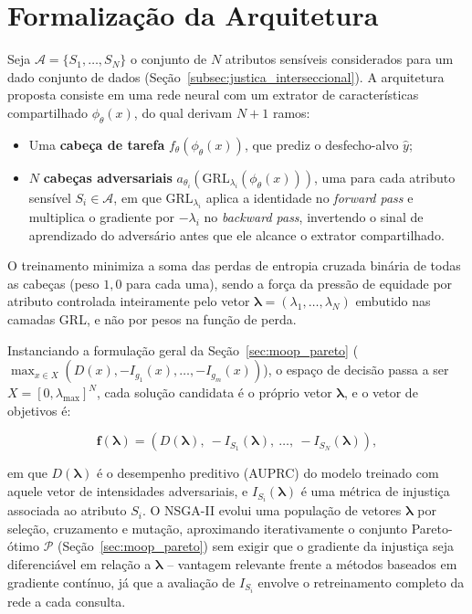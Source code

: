 \section{Formalização da Arquitetura}\label{sec:formalizacao_arquitetura}

Seja $\mathcal{A} = \{S_1, \ldots, S_N\}$ o conjunto de $N$ atributos sensíveis considerados para um dado conjunto de dados (Seção~\ref{subsec:justica_interseccional}). A arquitetura proposta consiste em uma rede neural com um extrator de características compartilhado $\phi_\theta(x)$, do qual derivam $N+1$ ramos:

\begin{itemize}
    \item Uma \textbf{cabeça de tarefa} $f_\theta(\phi_\theta(x))$, que prediz o desfecho-alvo $\hat{y}$;
    \item $N$ \textbf{cabeças adversariais} $a_{\theta_i}(\text{GRL}_{\lambda_i}(\phi_\theta(x)))$, uma para cada atributo sensível $S_i \in \mathcal{A}$, em que $\text{GRL}_{\lambda_i}$ aplica a identidade no \textit{forward pass} e multiplica o gradiente por $-\lambda_i$ no \textit{backward pass}, invertendo o sinal de aprendizado do adversário antes que ele alcance o extrator compartilhado.
\end{itemize}

O treinamento minimiza a soma das perdas de entropia cruzada binária de todas as cabeças (peso $1,0$ para cada uma), sendo a força da pressão de equidade por atributo controlada inteiramente pelo vetor $\boldsymbol{\lambda} = (\lambda_1, \ldots, \lambda_N)$ embutido nas camadas GRL, e não por pesos na função de perda.

Instanciando a formulação geral da Seção~\ref{sec:moop_pareto} ($\max_{x \in X} (D(x), -I_{g_1}(x), \ldots, -I_{g_m}(x))$), o espaço de decisão passa a ser $X = [0, \lambda_{\max}]^N$, cada solução candidata é o próprio vetor $\boldsymbol{\lambda}$, e o vetor de objetivos é:

\begin{equation}
    \mathbf{f}(\boldsymbol{\lambda}) = \left( D(\boldsymbol{\lambda}),\ -I_{S_1}(\boldsymbol{\lambda}),\ \ldots,\ -I_{S_N}(\boldsymbol{\lambda}) \right),
\end{equation}

em que $D(\boldsymbol{\lambda})$ é o desempenho preditivo (AUPRC) do modelo treinado com aquele vetor de intensidades adversariais, e $I_{S_i}(\boldsymbol{\lambda})$ é uma métrica de injustiça associada ao atributo $S_i$. O NSGA-II \citep{deb2002fast} evolui uma população de vetores $\boldsymbol{\lambda}$ por seleção, cruzamento e mutação, aproximando iterativamente o conjunto Pareto-ótimo $\mathcal{P}$ (Seção~\ref{sec:moop_pareto}) sem exigir que o gradiente da injustiça seja diferenciável em relação a $\boldsymbol{\lambda}$ -- vantagem relevante frente a métodos baseados em gradiente contínuo, já que a avaliação de $I_{S_i}$ envolve o retreinamento completo da rede a cada consulta.

